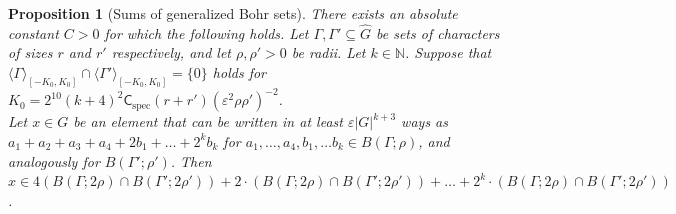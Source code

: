 \documentclass[a4paper,11pt]{article}
\numberwithin{theorem}{section}
\newtheorem{proposition}[theorem]{Proposition}
\theoremstyle{definition}
\newcommand{\on}[1]{
	\operatorname{#1}
}
\begin{document}
\begin{proposition}[Sums of generalized Bohr sets]\label{sumsofgenbohrs}
    There exists an absolute constant $C > 0$ for which the following holds. Let $\Gamma, \Gamma' \subseteq \hat{G}$ be sets of characters of sizes $r$ and $r'$ respectively, and let $\rho, \rho' > 0$ be radii. Let $k \in \mathbb{N}$. Suppose that $\langle\Gamma\rangle_{[-K_0, K_0]} \cap \langle\Gamma'\rangle_{[-K_0, K_0]} = \{0\}$ holds for $K_0 = 2^{10}(k+4)^2\mathsf{C}_{\on{spec}} (r + r') (\varepsilon^{2} \rho\rho')^{-2}$.\\
    \indent Let $x \in G$ be an element that can be written in at least $\varepsilon |G|^{k + 3}$ ways as $a_1 + a_2 + a_3 + a_4 + 2b_1 + \dots + 2^k b_k$ for $a_1, \dots, a_4, b_1, \dots b_k \in  B(\Gamma; \rho)$, and analogously for $ B(\Gamma'; \rho')$. Then $x \in 4(B(\Gamma; 2\rho) \cap B(\Gamma'; 2\rho')) + 2\cdot (B(\Gamma; 2\rho) \cap B(\Gamma'; 2\rho')) + \dots + 2^k \cdot (B(\Gamma; 2\rho) \cap B(\Gamma'; 2\rho'))$.
\end{proposition}
\end{document}
